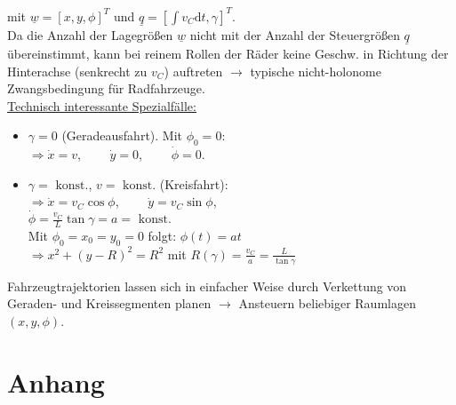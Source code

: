 \documentclass[a4paper,landscape,6pt]{article}
\newcommand{\ul}[1]{\underline{#1}}
\begin{document}
\begin{multicols}{3}
mit $\ul w = [x, y, \phi]^T$ und $\ul q = [\int v_C \mathrm{d}t, \gamma]^T$.\\

Da die Anzahl der Lagegrößen $\ul w$ nicht mit der Anzahl der Steuergrößen $\ul q$ übereinstimmt, kann bei reinem Rollen der Räder keine Geschw. in Richtung der Hinterachse (senkrecht zu $v_C$) auftreten $\rightarrow$ typische nicht-holonome Zwangsbedingung für Radfahrzeuge.\\

\ul{Technisch interessante Spezialfälle:}
\begin{itemize}
	\item $\gamma = 0$ (Geradeausfahrt). Mit $\phi_0=0$:\\
	$\Rightarrow \dot x = v$, $\qquad \dot y = 0$, $\qquad \dot \phi = 0$.
	\item $\gamma = \text{ konst.}$, $v=\text{ konst.}$ (Kreisfahrt):\\
	$\Rightarrow \dot x = v_C \cos \phi$, $\qquad \dot y = v_C \sin \phi$, \\$\dot \phi = \frac{v_C}{L}\tan\gamma = a = \text{ konst.}$\\
	Mit $\phi_0=x_0=y_0=0$ folgt: $\phi(t) = at$\\
	$\Rightarrow x^2 + (y-R)^2 = R^2$ mit $R(\gamma) = \frac{v_C}{a} = \frac{L}{\tan \gamma}$
\end{itemize}
Fahrzeugtrajektorien lassen sich in einfacher Weise durch Verkettung von Geraden- und Kreissegmenten planen $\rightarrow$ Ansteuern beliebiger Raumlagen $(x,y,\phi)$.


\section{Anhang}

\end{multicols}
\end{document}
